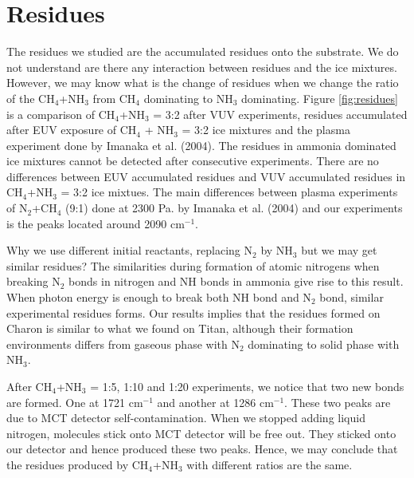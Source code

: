 \section{Residues}
The residues we studied are the accumulated residues onto the substrate. We do not understand are there any interaction between residues and the ice mixtures. However, we may know what is the change of residues when we change the ratio of the CH$_4$+NH$_3$ from CH$_4$ dominating to NH$_3$ dominating.  Figure \ref{fig:residues} is a comparison of CH$_4$+NH$_3$ = 3:2 after VUV experiments, residues accumulated after EUV exposure of CH$_4$ + NH$_3$ = 3:2 ice mixtures and the plasma experiment done by Imanaka et al. (2004)\cite{imanaka2004laboratory}. The residues in ammonia dominated ice mixtures cannot be detected after consecutive experiments. There are no differences between EUV accumulated residues and VUV accumulated residues in CH$_4$+NH$_3$ = 3:2 ice mixtues. The main differences between plasma experiments of N$_2$+CH$_4$ (9:1) done at 2300 Pa. by Imanaka et al. (2004)\cite{imanaka2004laboratory} and our experiments is the peaks located around 2090 cm$^{-1}$.

Why we use different initial reactants, replacing N$_2$ by NH$_3$ but we may get similar residues? The similarities during formation of atomic nitrogens when breaking N$_2$ bonds in nitrogen and NH bonds in ammonia give rise to this result. When photon energy is enough to break both NH bond and N$_2$ bond, similar experimental residues forms. Our results implies that the residues formed on Charon is similar to what we found on Titan, although their formation environments differs from gaseous phase with N$_2$ dominating to solid phase with NH$_3$.

After CH$_4$+NH$_3$ = 1:5, 1:10 and 1:20 experiments, we notice that two new bonds are formed. One at 1721 cm$^{-1}$ and another at 1286 cm$^{-1}$. These two peaks are due to MCT detector self-contamination. When we stopped adding liquid nitrogen, molecules stick onto MCT detector will be free out. They sticked onto our detector and hence produced these two peaks. Hence, we may conclude that the residues produced by CH$_4$+NH$_3$ with different ratios are the same.

